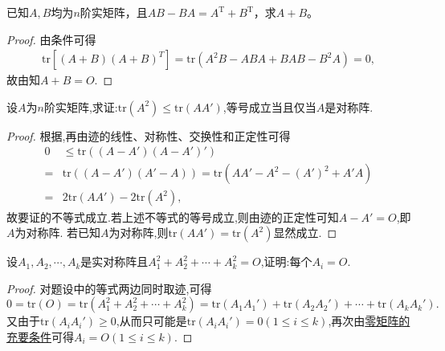 \documentclass[../../main.tex]{subfiles}
\begin{document}
\begin{example}
已知\( A,B \)均为\( n \)阶实矩阵，且\( AB - BA = A^{\text{T}} + B^{\text{T}} \)，求\( A + B \)。
\end{example}
\begin{proof}
由条件可得
\begin{align*}
\mathrm{tr}\left[ \left( A+B \right) \left( A+B \right) ^T \right] =\mathrm{tr}\left( A^2B-ABA+BAB-B^2A \right) =0,
\end{align*}
故由知$A+B=O.$

\end{proof}

\begin{proposition}\label{proposition:矩阵迹的不等式}
设\(A\)为\(n\)阶实矩阵,求证:\(\mathrm{tr}(A^2)\leqslant \mathrm{tr}(AA')\),等号成立当且仅当\(A\)是对称阵.
\end{proposition}
\begin{proof}
根据,再由迹的线性、对称性、交换性和正定性可得
\begin{align*}
0&\leqslant \mathrm{tr}((A - A')(A - A')')\\
=&\mathrm{tr}((A - A')(A' - A))=\mathrm{tr}(AA' - A^2 - (A')^2 + A'A)\\
=&2\mathrm{tr}(AA') - 2\mathrm{tr}(A^2),
\end{align*}
故要证的不等式成立.若上述不等式的等号成立,则由迹的正定性可知\(A - A' = O\),即\(A\)为对称阵.
若已知$A$为对称阵,则$\mathrm{tr}(AA') = \mathrm{tr}(A^2)$显然成立.

\end{proof}

\begin{example}
设\(A_1,A_2,\cdots,A_k\)是实对称阵且\(A_1^2 + A_2^2+\cdots+A_k^2 = O\),证明:每个\(A_i = O\).
\end{example}
\begin{proof}
对题设中的等式两边同时取迹,可得
\[
0=\mathrm{tr}(O)=\mathrm{tr}(A_1^2 + A_2^2+\cdots+A_k^2)=\mathrm{tr}(A_1A_1')+\mathrm{tr}(A_2A_2')+\cdots+\mathrm{tr}(A_kA_k').
\]
又由于\(\mathrm{tr}(A_iA_i')\geqslant 0\),从而只可能是\(\mathrm{tr}(A_iA_i') = 0(1\leqslant  i\leqslant  k)\),再次由\hyperref[proposition:零矩阵的充要条件]{零矩阵的充要条件}可得\(A_i = O(1\leqslant  i\leqslant  k)\).

\end{proof}
\end{document}
